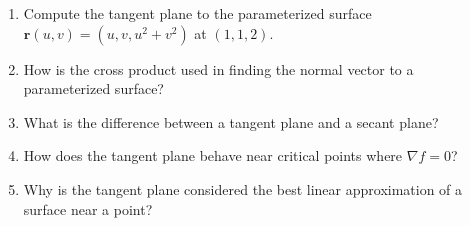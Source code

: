 \begin{enumerate}
  \item Compute the tangent plane to the parameterized surface \(\mathbf{r}(u,v) = (u, v, u^{2} + v^{2})\) at \((1,1,2)\).
  \item How is the cross product used in finding the normal vector to a parameterized surface?
  \item What is the difference between a tangent plane and a secant plane?
  \item How does the tangent plane behave near critical points where \(\nabla f = 0\)?
  \item Why is the tangent plane considered the best linear approximation of a surface near a point?
\end{enumerate}
